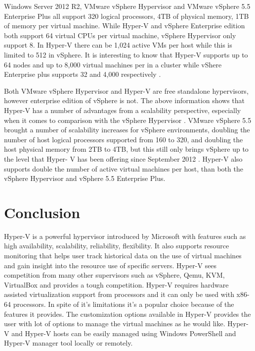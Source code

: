 \documentclass[9pt,twocolumn,twoside]{../../styles/osajnl}
\begin{document}
Windows Server 2012 R2, VMware vSphere Hypervisor and VMware vSphere
5.5 Enterprise Plus all support 320 logical processors, 4TB of
physical memory, 1TB of memory per virtual machine. While Hyper-V and
vSphere Enterprise edition both support 64 virtual CPUs per virtual
machine, vSphere Hypervisor only support 8. In Hyper-V there can be
1,024 active VMs per host while this is limited to 512 in vSphere. It
is interesting to know that Hyper-V supports up to 64 nodes and up to
8,000 virtual machines per in a cluster while vShere Enterprise plus
supports 32 and 4,000 respectively \cite{www-hyperv-paper}.

Both VMware vSphere Hypervisor and Hyper-V are free standalone
hypervisors, however enterprise edition of vSphere is not. The above
information shows that Hyper-V has a number of advantages from a
scalability perspective, especially when it comes to comparison with
the vSphere Hypervisor \cite{www-hyperv-paper}. VMware vSphere 5.5
brought a number of scalability increases for vSphere environments,
doubling the number of host logical processors supported from 160 to
320, and doubling the host physical memory from 2TB to 4TB, but this
still only brings vSphere up to the level that Hyper- V has been
offering since September 2012 \cite{www-hyperv-paper}. Hyper-V also
supports double the number of active virtual machines per host, than
both the vSphere Hypervisor and vSphere 5.5 Enterprise Plus.


\section{Conclusion}

Hyper-V is a powerful hypervisor introduced by Microsoft with features
such as high availability, scalability, reliability, flexibility. It
also supports resource monitoring that helps user track historical
data on the use of virtual machines and gain insight into the resource
use of specific servers. Hyper-V sees competition from many other
supervisors such as vSphere, Qemu, KVM, VirtualBox and provides a
tough competition. Hyper-V requires hardware assisted virtualization
support from processors and it can only be used with x86-64
processors. In spite of it's limitations it's a popular choice because
of the features it provides. The customization options available in
Hyper-V provides the user with lot of options to manage the virtual
machines as he would like. Hyper-V and Hyper-V hosts can be easily
managed using Windows PowerShell and Hyper-V manager tool locally or
remotely.



\end{document}
